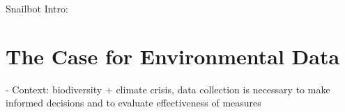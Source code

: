 Snailbot Intro:


\section{The Case for Environmental Data} %
- Context: biodiversity + climate crisis, data collection is necessary to make informed decisions and to evaluate effectiveness of measures

